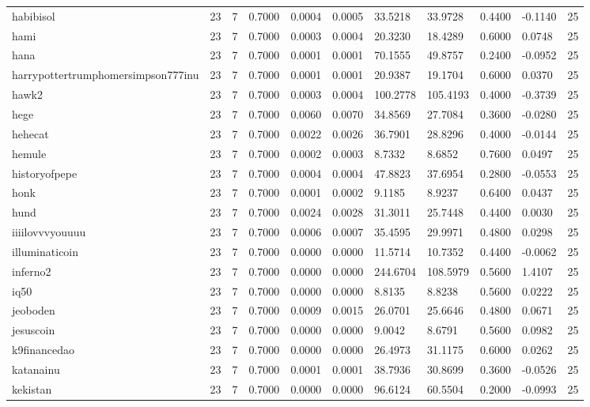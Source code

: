 \begin{table}[htbp]
\begin{tabular}{lllllllllll}
habibisol & 23 & 7 & 0.7000 & 0.0004 & 0.0005 & 33.5218 & 33.9728 & 0.4400 & -0.1140 & 25 \\
hami & 23 & 7 & 0.7000 & 0.0003 & 0.0004 & 20.3230 & 18.4289 & 0.6000 & 0.0748 & 25 \\
hana & 23 & 7 & 0.7000 & 0.0001 & 0.0001 & 70.1555 & 49.8757 & 0.2400 & -0.0952 & 25 \\
harrypottertrumphomersimpson777inu & 23 & 7 & 0.7000 & 0.0001 & 0.0001 & 20.9387 & 19.1704 & 0.6000 & 0.0370 & 25 \\
hawk2 & 23 & 7 & 0.7000 & 0.0003 & 0.0004 & 100.2778 & 105.4193 & 0.4000 & -0.3739 & 25 \\
hege & 23 & 7 & 0.7000 & 0.0060 & 0.0070 & 34.8569 & 27.7084 & 0.3600 & -0.0280 & 25 \\
hehecat & 23 & 7 & 0.7000 & 0.0022 & 0.0026 & 36.7901 & 28.8296 & 0.4000 & -0.0144 & 25 \\
hemule & 23 & 7 & 0.7000 & 0.0002 & 0.0003 & 8.7332 & 8.6852 & 0.7600 & 0.0497 & 25 \\
historyofpepe & 23 & 7 & 0.7000 & 0.0004 & 0.0004 & 47.8823 & 37.6954 & 0.2800 & -0.0553 & 25 \\
honk & 23 & 7 & 0.7000 & 0.0001 & 0.0002 & 9.1185 & 8.9237 & 0.6400 & 0.0437 & 25 \\
hund & 23 & 7 & 0.7000 & 0.0024 & 0.0028 & 31.3011 & 25.7448 & 0.4400 & 0.0030 & 25 \\
iiiilovvvyouuuu & 23 & 7 & 0.7000 & 0.0006 & 0.0007 & 35.4595 & 29.9971 & 0.4800 & 0.0298 & 25 \\
illuminaticoin & 23 & 7 & 0.7000 & 0.0000 & 0.0000 & 11.5714 & 10.7352 & 0.4400 & -0.0062 & 25 \\
inferno2 & 23 & 7 & 0.7000 & 0.0000 & 0.0000 & 244.6704 & 108.5979 & 0.5600 & 1.4107 & 25 \\
iq50 & 23 & 7 & 0.7000 & 0.0000 & 0.0000 & 8.8135 & 8.8238 & 0.5600 & 0.0222 & 25 \\
jeoboden & 23 & 7 & 0.7000 & 0.0009 & 0.0015 & 26.0701 & 25.6646 & 0.4800 & 0.0671 & 25 \\
jesuscoin & 23 & 7 & 0.7000 & 0.0000 & 0.0000 & 9.0042 & 8.6791 & 0.5600 & 0.0982 & 25 \\
k9financedao & 23 & 7 & 0.7000 & 0.0000 & 0.0000 & 26.4973 & 31.1175 & 0.6000 & 0.0262 & 25 \\
katanainu & 23 & 7 & 0.7000 & 0.0001 & 0.0001 & 38.7936 & 30.8699 & 0.3600 & -0.0526 & 25 \\
kekistan & 23 & 7 & 0.7000 & 0.0000 & 0.0000 & 96.6124 & 60.5504 & 0.2000 & -0.0993 & 25 \\

\end{tabular}
\end{table}
